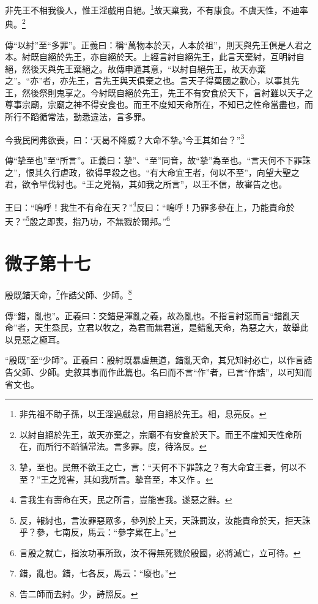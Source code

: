 非先王不相我後人，惟王淫戲用自絕。\footnote{非先祖不助子孫，以王淫過戲怠，用自絕於先王。相，息亮反。}故天棄我，不有康食。不虞天性，不迪率典。\footnote{以紂自絕於先王，故天亦棄之，宗廟不有安食於天下。而王不度知天性命所在，而所行不蹈循常法。言多罪。度，待洛反。}

{\noindent\zhuan{}\fzbyks 傳“以紂”至“多罪”。正義曰：稱“萬物本於天，人本於祖”，則天與先王俱是人君之本。紂既自絕於先王，亦自絕於天。上經言紂自絕先王，此言天棄紂，互明紂自絕，然後天與先王棄絕之。故傳申通其意，“以紂自絕先王，故天亦棄之”。“亦”者，亦先王，言先王與天俱棄之也。言天子得萬國之歡心，以事其先王，然後祭則鬼享之。今紂既自絕於先王，先王不有安食於天下，言紂雖以天子之尊事宗廟，宗廟之神不得安食也。而王不度知天命所在，不知已之性命當盡也，而所行不蹈循常法，動悉違法，言多罪。 \par}

今我民罔弗欲喪，曰：‘天曷不降威？大命不摯。’今王其如台？”\footnote{摯，至也。民無不欲王之亡，言：“天何不下罪誅之？有大命宜王者，何以不至？”王之兇害，其如我所言。摯音至，本又作𡠗。}

{\noindent\zhuan{}\fzbyks 傳“摯至也”至“所言”。正義曰：摯”、“至”同音，故“摯”為至也。“言天何不下罪誅之”，恨其久行虐政，欲得早殺之也。“有大命宜王者，何以不至”，向望大聖之君，欲令早伐紂也。“王之兇禍，其如我之所言”，以王不信，故審告之也。 \par}

王曰：“嗚呼！我生不有命在天？”\footnote{言我生有壽命在天，民之所言，豈能害我。遂惡之辭。}反曰：“嗚呼！乃罪多參在上，乃能責命於天？”\footnote{反，報紂也，言汝罪惡眾多，參列於上天，天誅罰汝，汝能責命於天，拒天誅乎？參，七南反，馬云：“參字累在上。”}殷之即喪，指乃功，不無戮於爾邦。”\footnote{言殷之就亡，指汝功事所致，汝不得無死戮於殷國，必將滅亡，立可待。}

\section{微子第十七}


殷既錯天命，\footnote{錯，亂也。錯，七各反，馬云：“廢也。”}作誥父師、少師。\footnote{告二師而去紂。少，詩照反。}


{\noindent\zhuan{}\fzbyks 傳“錯，亂也”。正義曰：交錯是渾亂之義，故為亂也。不指言紂惡而言“錯亂天命”者，天生烝民，立君以牧之，為君而無君道，是錯亂天命，為惡之大，故舉此以見惡之極耳。 \par}

{\noindent\shu{}\fzkt “殷既”至“少師”。正義曰：殷紂既暴虐無道，錯亂天命，其兄知紂必亡，以作言誥告父師、少師。史敘其事而作此篇也。名曰而不言“作”者，已言“作誥”，以可知而省文也。 \par}

